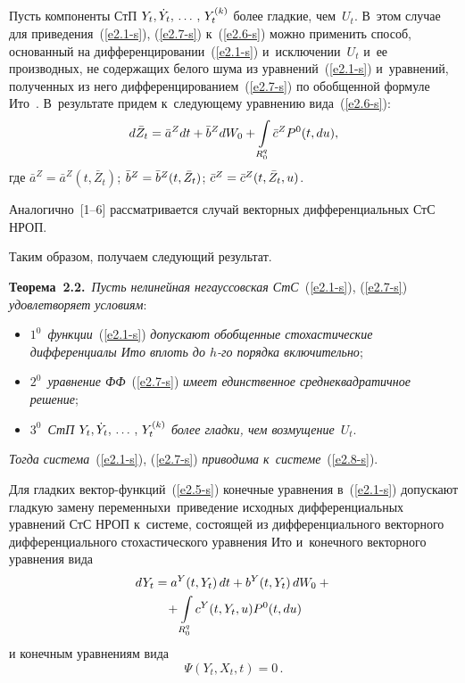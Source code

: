 \begin{multicols}{2}
Пусть компоненты СтП $Y_t, \dot Y_t,\,\ldots\,,\, Y_t^{(k)}$ более гладкие, чем~$U_t$. 
В~этом случае для приведения~(\ref{e2.1-s}), (\ref{e2.7-s}) к~(\ref{e2.6-s}) можно применить способ, 
основанный на дифференцировании~(\ref{e2.1-s}) и~исключении~$U_t$ и~ее производных, не 
содержащих белого шума из уравнений~(\ref{e2.1-s}) и~уравнений, полученных из него 
дифференцированием~(\ref{e2.7-s}) по обобщенной формуле Ито~\cite{11-s, 12-s}. В~результате придем к~следующему уравнению вида~(\ref{e2.6-s}):
    \begin{equation}
    d\bar Z_t = \bar a^Z dt + \bar b^Z dW_0 + \int\limits_{R_0^q} \bar c^Z P^0 (t, du),\label{e2.8-s}
    \end{equation}
где $\bar a^Z = \bar a^Z(t,\bar Z_t)$; $\bar b^Z \hm= \bar b^Z(t, \bar Z_t)$; $\bar c^Z \hm= \bar c^Z(t, \bar Z_t, u)$.

Аналогично~[1--6] рассматривается случай векторных дифференциальных СтС НРОП.

Таким образом, получаем следующий результат.

\smallskip

\noindent
\textbf{Теорема~2.2.}\ \textit{Пусть нелинейная негауссовская СтС}~(\ref{e2.1-s}), (\ref{e2.7-s}) \textit{удовлетворяет условиям}:
\begin{itemize}
\item[\,]
 $1^0$~\textit{функции}~(\ref{e2.1-s}) \textit{допускают обобщенные стохастические дифференциалы Ито 
вплоть до $h$-го порядка включительно};
\item[\,]
 $2^0$~\textit{уравнение ФФ}~(\ref{e2.7-s}) \textit{имеет единственное среднеквадратичное решение};
\item[\,]
 $3^0$~\textit{СтП $Y_t, \dot Y_t,\,\ldots\,,\, Y_t^{(k)}$ более гладки, чем возмущение}~$U_t$.
\end{itemize}
\textit{Тогда система}~(\ref{e2.1-s}), (\ref{e2.7-s}) \textit{приводима к~системе}~(\ref{e2.8-s}).


Для гладких  век\-тор-функ\-ций~(\ref{e2.5-s}) конечные уравнения в~(\ref{e2.1-s}) допускают гладкую 
замену переменных\linebreak и~приведение исходных дифференциальных уравнений СтС НРОП 
к~сис\-те\-ме, со\-сто\-ящей из дифференциального векторного дифференциального 
\mbox{стохастического} уравнения Ито и~конечного векторного уравнения вида
    \begin{multline}
    dY_t = a^Y (t,Y_t)\, dt + b^Y (t,Y_t)\, d W_0 + {}\\
    {}+\int\limits_{R_0^q} c^Y (t,Y_t, u) 
P^0 (t,du)
\label{e2.9-s}
\end{multline}
и конечным уравнениям вида
  \begin{equation}
  \Psi(Y_t, X_t, t) =0\,.
  \label{e2.10-s}
  \end{equation}


\end{multicols}

